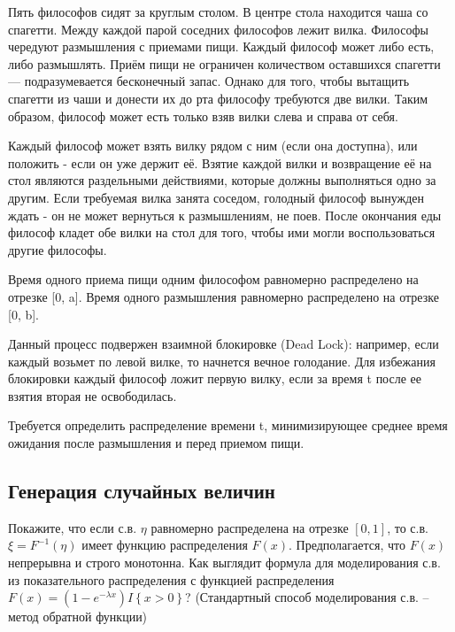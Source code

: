 \begin{problem}
Пять философов сидят за круглым столом. В центре стола находится чаша со
спагетти. Между каждой парой соседних философов лежит вилка. Философы чередуют размышления с приемами пищи. Каждый философ может либо есть, либо размышлять. Приём пищи не ограничен
количеством оставшихся спагетти — подразумевается бесконечный запас. Однако
для того, чтобы вытащить спагетти из чаши и донести их до рта философу требуются
две вилки. Таким образом, философ может есть только взяв вилки слева и справа от
себя. 

Каждый философ может взять вилку рядом с ним (если она доступна), или положить
- если он уже держит её. Взятие каждой вилки и возвращение её на стол являются
раздельными действиями, которые должны выполняться одно за другим. Если
требуемая вилка занята соседом, голодный философ вынужден ждать - он не
может вернуться к размышлениям, не поев. После окончания еды философ кладет
обе вилки на стол для того, чтобы ими могли воспользоваться другие философы.

Время одного приема пищи одним философом равномерно распределено на отрезке [0, a]. 
Время одного размышления равномерно распределено на отрезке [0, b].

Данный процесс подвержен взаимной блокировке (Dead Lock): например, если каждый возьмет по левой вилке, то начнется вечное голодание. Для избежания блокировки каждый философ ложит первую вилку, если за время t после ее взятия вторая не освободилась.

Требуется определить распределение времени t, минимизирующее среднее время ожидания после размышления и перед приемом пищи.

\end{problem}


\subsection{Генерация случайных величин}

\begin{problem}
Покажите, что если с.в. $\eta $ равномерно распределена на отрезке $\left[0,1\right]$, то с.в. $\xi =F^{-1} \left(\eta \right)$ имеет функцию распределения $F\left(x\right)$. Предполагается, что $F\left(x\right)$ непрерывна и строго монотонна. Как выглядит формула для моделирования с.в. из показательного распределения с функцией распределения $F\left(x\right)=\left(1-e^{-\lambda x} \right)I\left\{x>0\right\}$? (Стандартный способ моделирования с.в. -- метод обратной функции)
\end{problem}

